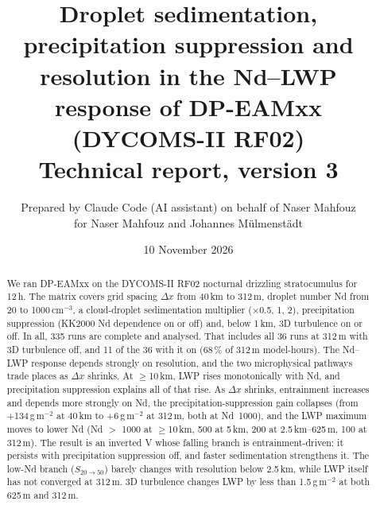 \documentclass[10pt]{article}
\title{\bfseries Droplet sedimentation, precipitation suppression and resolution in the Nd--LWP response of DP-EAMxx (DYCOMS-II RF02)\\[4pt]\large Technical report, version 3}
\author{Prepared by Claude Code (AI assistant) on behalf of Naser Mahfouz\\ for Naser Mahfouz and Johannes M\"ulmenst\"adt}
\date{10 November 2026}
\begin{document}
\sloppy
\maketitle

\begin{abstract}\noindent
We ran DP-EAMxx on the DYCOMS-II RF02 nocturnal drizzling stratocumulus for 12\,h. The matrix covers grid spacing $\Delta x$ from 40\,km to 312\,m,
droplet number Nd from 20 to 1000\,cm$^{-3}$, a cloud-droplet sedimentation multiplier ($\times$0.5, 1, 2), precipitation suppression
(KK2000 Nd dependence on or off) and, below 1\,km, 3D turbulence on or off. In all, 335 runs are complete and analysed. That includes all 36 runs at 312\,m with 3D turbulence off, and 11 of the 36 with it on (68\,\% of 312\,m model-hours).
The Nd--LWP response depends strongly on resolution, and the two microphysical pathways trade places as $\Delta x$ shrinks.
At $\geq$10\,km, LWP rises monotonically with Nd, and precipitation suppression explains all of that rise.
As $\Delta x$ shrinks, entrainment increases and depends more strongly on Nd, the precipitation-suppression gain collapses
(from +134\,g\,m$^{-2}$ at 40\,km to +6\,g\,m$^{-2}$ at 312\,m, both at Nd~1000), and the LWP maximum moves to lower Nd
(Nd $>$ 1000 at $\geq$10\,km, 500 at 5\,km, 200 at 2.5\,km--625\,m, 100 at 312\,m). The result is an inverted V whose falling branch is
entrainment-driven: it persists with precipitation suppression off, and faster sedimentation strengthens it. The low-Nd branch ($S_{20\to50}$) barely changes with
resolution below 2.5\,km, while LWP itself has not converged at 312\,m. 3D turbulence changes LWP by less than 1.5\,g\,m$^{-2}$ at both 625\,m and 312\,m.
\end{abstract}
\end{document}
